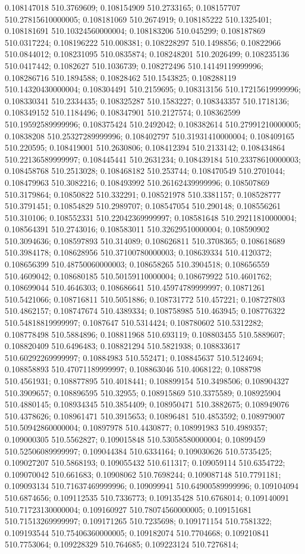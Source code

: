 0.108147018 510.3769609; 0.108154909 510.2733165; 0.108157707 510.27815610000005; 0.108181069 510.2674919; 0.108185222 510.1325401; 0.108181691 510.10324560000004; 0.108183206 510.045299; 0.108187869 510.0317224; 0.108196222 510.008381; 0.108228297 510.1498856; 0.10822966 510.0844012; 0.108231095 510.0835874; 0.108248201 510.2026499; 0.108235136 510.0417442; 0.1082627 510.1036739; 0.108272496 510.14149119999996; 0.108286716 510.1894588; 0.10828462 510.1543825; 0.108288119 510.14320430000004; 0.108304491 510.2159695; 0.108313156 510.17215619999996; 0.108330341 510.2334435; 0.108325287 510.1583227; 0.108343357 510.1718136; 0.108349152 510.1184496; 0.108347901 510.2127574; 0.108362599 510.19592589999996; 0.108375424 510.2492042; 0.108382614 510.27991210000005; 0.10838208 510.25327289999996; 0.108402797 510.31931410000004; 0.108409165 510.220595; 0.108419001 510.2630806; 0.108412394 510.2133142; 0.108434864 510.22136589999997; 0.108445441 510.2631234; 0.108439184 510.23378610000003; 0.108458768 510.2513028; 0.108468182 510.253744; 0.108470549 510.2701044; 0.108479963 510.3082216; 0.108493992 510.26162439999996; 0.108507869 510.3179864; 0.10850822 510.332291; 0.108521978 510.3381157; 0.108528777 510.3791451; 0.10854829 510.2989707; 0.108547054 510.290148; 0.108556261 510.310106; 0.108552331 510.22042369999997; 0.108581648 510.29211810000004; 0.108564391 510.2743016; 0.108583011 510.32629510000004; 0.108590902 510.3094636; 0.108597893 510.314089; 0.108626811 510.3708365; 0.108618689 510.3984178; 0.108628956 510.37100780000003; 0.108639334 510.4120372; 0.108656399 510.48750060000003; 0.108658265 510.3904518; 0.108656559 510.4609042; 0.108680185 510.50159110000004; 0.108679922 510.4601762; 0.108699044 510.4646303; 0.108686641 510.45974789999997; 0.10871261 510.5421066; 0.108716811 510.5051886; 0.108731772 510.457221; 0.108727803 510.4862157; 0.108747674 510.4389334; 0.108758985 510.463945; 0.108776322 510.54818819999997; 0.1087647 510.5314424; 0.108780602 510.5312282; 0.108778498 510.5884896; 0.108811968 510.693119; 0.108803455 510.5889607; 0.108820409 510.6496483; 0.108821294 510.5821938; 0.108833617 510.60292269999997; 0.10884983 510.552471; 0.108845637 510.5124694; 0.108858893 510.47071189999997; 0.108863046 510.4068122; 0.1088798 510.4561931; 0.108877895 510.4018441; 0.108899154 510.3498506; 0.108904327 510.3909657; 0.108896595 510.32955; 0.108915869 510.3375589; 0.108925904 510.4880145; 0.108934345 510.3854409; 0.108950471 510.3882675; 0.108949076 510.4378626; 0.108961471 510.3915653; 0.10896481 510.4853592; 0.108979007 510.50942860000004; 0.10897978 510.4430877; 0.108991983 510.4989357; 0.109000305 510.5562827; 0.109015848 510.53058580000004; 0.10899459 510.52506089999997; 0.109044384 510.6334164; 0.109030626 510.5735425; 0.109027207 510.5868193; 0.109055432 510.611317; 0.109059114 510.6354722; 0.109070042 510.661683; 0.10908062 510.7698244; 0.109087148 510.7791181; 0.109093134 510.71637469999996; 0.109099941 510.64900589999996; 0.109104094 510.6874656; 0.109112535 510.7336773; 0.109135428 510.6768014; 0.109140091 510.71723130000004; 0.109160927 510.78074560000005; 0.109151681 510.71513269999997; 0.109171265 510.7235698; 0.109171154 510.7581322; 0.109193544 510.75406360000005; 0.109182074 510.7704668; 0.109210841 510.7753064; 0.109228329 510.764685; 0.109223124 510.7276814; 